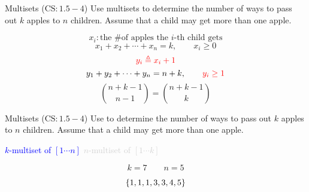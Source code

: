 
\begin{frame}{}
  \begin{exampleblock}{Multisets ($\text{CS}: 1.5-4$)}
    Use multisets to determine the number of ways to pass out $k$  apples to $n$ children. 
    Assume that a child may get more than one apple.
  \end{exampleblock}

  \pause
  \[
    x_i: \text{the \# of apples the $i$-th child gets}
  \]
  \[
    x_1 + x_2 + \cdots + x_n = k, \qquad x_i \ge 0
  \]
  \pause
  \[
    \textcolor{red}{y_i \triangleq x_i + 1}
  \]
  \pause
  \[
    y_1 + y_2 + \cdots + y_n = n + k, \qquad \textcolor{red}{y_i \ge 1}
  \]
  \pause 
  \[
    \binom{n+k-1}{n-1} = \binom{n+k-1}{k}
  \]
\end{frame}

\begin{frame}{}
  \begin{exampleblock}{Multisets ($\text{CS}: 1.5-4$)}
    Use  to determine the number of ways to pass out $k$  apples to $n$ children. 
    Assume that a child may get more than one apple.
  \end{exampleblock}

  \pause
  \vspace{0.30cm}
  \centerline{ \textcolor<6->{blue}{$k$-multiset of $[1 \cdots n]$} \emph{} \textcolor<6->{lightgray}{$n$-multiset of $[1 \cdots k]$}}

  \pause
  \[
    k = 7 \qquad n = 5
  \]

  \pause

  \pause
  \vspace{-0.80cm}
  \[
    \{1,1,1,3,3,4,5\}
  \]
\end{frame}
